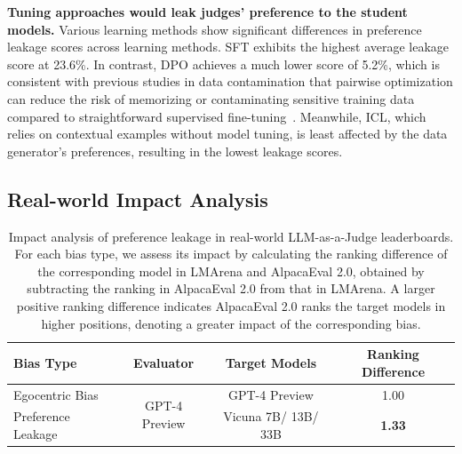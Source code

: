 \documentclass{article} %
\begin{document}
\textbf{Tuning approaches would leak judges' preference to the student models.} Various learning methods show significant differences in preference leakage scores across learning methods. SFT exhibits the highest average leakage score at 23.6\%.
In contrast, DPO achieves a much lower score of 5.2\%, which is consistent with previous studies in data contamination that pairwise optimization can reduce the risk of memorizing or contaminating sensitive training data compared to straightforward supervised fine-tuning~\cite{hayesmeasuring}.
Meanwhile, ICL, which relies on contextual examples without model tuning, is least affected by the data generator’s preferences, resulting in the lowest leakage scores.



\subsection{Real-world Impact Analysis}
\label{Real-world Impact Analysis}


\begin{table}[h]
\centering
\vspace{-10pt}
\caption{Impact analysis of preference leakage in real-world LLM-as-a-Judge leaderboards. For each bias type, we assess its impact by calculating the ranking difference of the corresponding model in LMArena and AlpacaEval 2.0, obtained by subtracting the ranking in AlpacaEval 2.0 from that in LMArena. A larger positive ranking difference indicates AlpacaEval 2.0 ranks the target models in higher positions, denoting a greater impact of the corresponding bias.}
\vspace{5pt}
\renewcommand{\arraystretch}{1.2}
\begin{tabular}{lccc}
\toprule[1.5pt]
\textbf{Bias Type}          & \textbf{Evaluator}                              & \textbf{Target Models}                  & \textbf{Ranking Difference} \\ \hline
Egocentric Bias    & \multirow{2}{*}{GPT-4 Preview} & GPT-4 Preview             & 1.00               \\
Preference Leakage &                                        & Vicuna 7B/ 13B/ 33B & \textbf{1.33} \\
\toprule[1.5pt]
\end{tabular}
\label{tab:real-world}
\vspace{-10pt}
\end{table}
\end{document}
